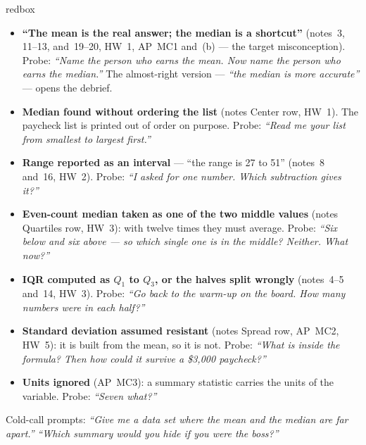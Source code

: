 \documentclass[10pt]{article}
\begin{document}
\boxguard
\begin{skillbox}{redbox}
\begin{itemize}[leftmargin=1.2em, nosep]
  \item \textbf{``The mean is the real answer; the median is a shortcut''} (notes~3, 11--13,
        and~19--20, HW~1, AP~MC1 and~(b) --- the target misconception). Probe: \emph{``Name the
        person who earns the mean. Now name the person who earns the median.''} The
        almost-right version --- \emph{``the median is more accurate''} --- opens the debrief.
  \item \textbf{Median found without ordering the list} (notes Center row, HW~1). The paycheck list is
        printed out of order on purpose. Probe: \emph{``Read me your list from smallest to
        largest first.''}
  \item \textbf{Range reported as an interval} --- ``the range is 27 to 51'' (notes~8 and~16,
        HW~2). Probe: \emph{``I asked for one number. Which subtraction gives it?''}
  \item \textbf{Even-count median taken as one of the two middle values} (notes Quartiles row, HW~3): with
        twelve times they must average. Probe: \emph{``Six below and six above --- so which
        single one is in the middle? Neither. What now?''}
  \item \textbf{IQR computed as $Q_1$ to $Q_3$, or the halves split wrongly} (notes~4--5 and~14,
        HW~3). Probe: \emph{``Go back to the warm-up on the board. How many numbers were in each
        half?''}
  \item \textbf{Standard deviation assumed resistant} (notes Spread row, AP~MC2, HW~5): it is built from
        the mean, so it is not. Probe: \emph{``What is inside the formula? Then how could it
        survive a \$3{,}000 paycheck?''}
  \item \textbf{Units ignored} (AP~MC3): a summary statistic carries the units of the variable.
        Probe: \emph{``Seven what?''}
\end{itemize}
Cold-call prompts: \emph{``Give me a data set where the mean and the median are far apart.''}
\quad \emph{``Which summary would you hide if you were the boss?''}
\end{skillbox}
\end{document}
